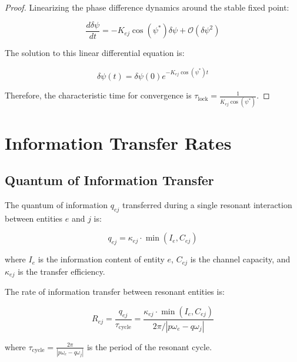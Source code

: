 \begin{proof}
Linearizing the phase difference dynamics around the stable fixed point:

\begin{equation}
\frac{d\delta\psi}{dt} = -K_{ej}\cos(\psi^*)\delta\psi + \mathcal{O}(\delta\psi^2)
\end{equation}

The solution to this linear differential equation is:

\begin{equation}
\delta\psi(t) = \delta\psi(0)e^{-K_{ej}\cos(\psi^*)t}
\end{equation}

Therefore, the characteristic time for convergence is $\tau_{\text{lock}} = \frac{1}{K_{ej}\cos(\psi^*)}$.
\end{proof}

\section{Information Transfer Rates}

\subsection{Quantum of Information Transfer}

\begin{definition}
The quantum of information $q_{ej}$ transferred during a single resonant interaction between entities $e$ and $j$ is:

\begin{equation}
q_{ej} = \kappa_{ej} \cdot \min\left(I_e, C_{ej}\right)
\end{equation}

where $I_e$ is the information content of entity $e$, $C_{ej}$ is the channel capacity, and $\kappa_{ej}$ is the transfer efficiency.
\end{definition}

\begin{theorem}
The rate of information transfer between resonant entities is:

\begin{equation}
R_{ej} = \frac{q_{ej}}{\tau_{\text{cycle}}} = \frac{\kappa_{ej} \cdot \min\left(I_e, C_{ej}\right)}{2\pi/|p\omega_e - q\omega_j|}
\end{equation}

where $\tau_{\text{cycle}} = \frac{2\pi}{|p\omega_e - q\omega_j|}$ is the period of the resonant cycle.
\end{theorem}

